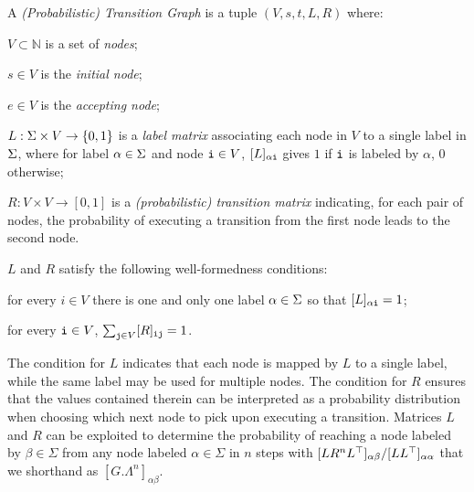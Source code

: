 \begin{definition} A \emph{(Probabilistic) Transition Graph} is a tuple $(V,s,t,L,R)$ where:
  \begin{inparaenum}[\itshape (i)]
    \item $V \subset \mathbb{N}$ is a set of \emph{nodes};
    \item $s\in V$ is the \emph{initial node};
    \item $e\in V$ is the \emph{accepting node};
    \item $L: \Sigma \times V \rightarrow \{0,1\}$ is a \emph{label matrix} associating each node in $V$ to a single label in $\Sigma$, where for label $\alpha \in \Sigma$ and node $\textnormal{\texttt{i}} \in V$, $[L]_{\alpha\textnormal{\texttt{i}}}$ gives $1$ if $\textnormal{\texttt{i}}$ is labeled by $\alpha$, $0$ otherwise;
    \item $R: V \times V \rightarrow [0,1]$ is a \emph{(probabilistic) transition matrix} indicating, for each pair of nodes, the probability of executing a transition from the first node leads to the second node.
  \end{inparaenum}
$L$ and $R$ satisfy the following well-formedness conditions:
\begin{inparaenum}[\itshape (i)]
\item for every $i \in V$ there is one and only one label $\alpha \in \Sigma$ so   that $[L]_{\alpha\textnormal{\texttt{i}}}=1$;
\item  for  every $\textnormal{\texttt{i}} \in V$, $\sum_{\textnormal{\texttt{j}}\in V}[R]_{\textnormal{\texttt{ij}}}=1$.
\end{inparaenum}
\end{definition}
The condition for $L$ indicates that each node is mapped by $L$ to a single label, while the same label may be used for multiple nodes. The condition for $R$ ensures that the values contained therein can be interpreted as a probability distribution when choosing which next node to pick upon executing a transition. Matrices $L$ and $R$ can be exploited to determine the probability of reaching a node labeled by $\beta\in\Sigma$ from any node labeled $\alpha\in\Sigma$ in $n$ steps with $[LR^nL^\top]_{\alpha\beta}/[LL^\top]_{\alpha\alpha}$ that we shorthand as $[G.\Lambda^n]_{\alpha\beta}$\cite{GartnerFW03}.

